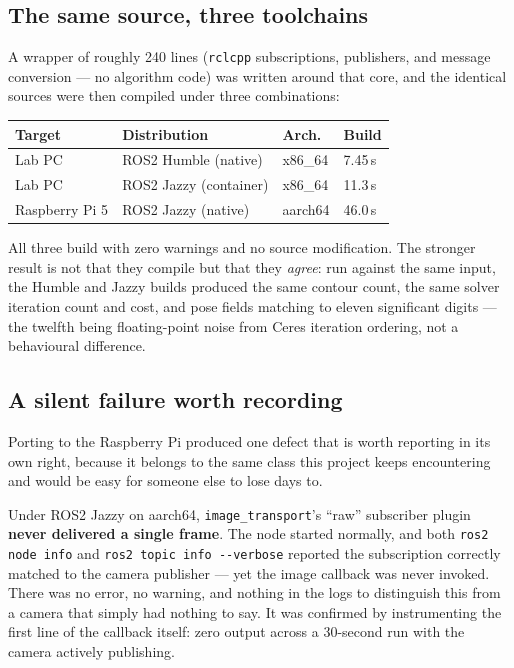 \documentclass[11pt]{article}
\begin{document}
\subsection{The same source, three toolchains}

A wrapper of roughly 240 lines (\texttt{rclcpp} subscriptions, publishers,
and message conversion --- no algorithm code) was written around that core,
and the identical sources were then compiled under three combinations:

\begin{center}
\begin{tabular}{@{}llll@{}}
\toprule
\textbf{Target} & \textbf{Distribution} & \textbf{Arch.} & \textbf{Build} \\
\midrule
Lab PC            & ROS2 Humble (native)    & x86\_64 & 7.45\,s \\
Lab PC            & ROS2 Jazzy (container)  & x86\_64 & 11.3\,s \\
Raspberry Pi 5    & ROS2 Jazzy (native)     & aarch64 & 46.0\,s \\
\bottomrule
\end{tabular}
\end{center}

All three build with zero warnings and no source modification. The stronger
result is not that they compile but that they \emph{agree}: run against the
same input, the Humble and Jazzy builds produced the same contour count, the
same solver iteration count and cost, and pose fields matching to eleven
significant digits --- the twelfth being floating-point noise from Ceres
iteration ordering, not a behavioural difference.

\subsection{A silent failure worth recording}

Porting to the Raspberry Pi produced one defect that is worth reporting in
its own right, because it belongs to the same class this project keeps
encountering and would be easy for someone else to lose days to.

Under ROS2 Jazzy on aarch64, \texttt{image\_transport}'s ``raw'' subscriber
plugin \textbf{never delivered a single frame}. The node started normally,
and both \texttt{ros2 node info} and \texttt{ros2 topic info -{}-verbose}
reported the subscription correctly matched to the camera publisher --- yet
the image callback was never invoked. There was no error, no warning, and
nothing in the logs to distinguish this from a camera that simply had
nothing to say. It was confirmed by instrumenting the first line of the
callback itself: zero output across a 30-second run with the camera actively
publishing.
\end{document}

